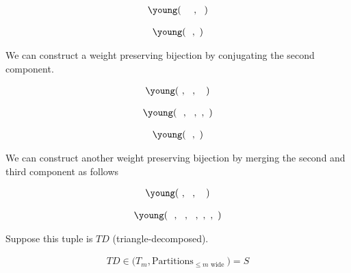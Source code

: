 \documentclass{report}
\begin{document}
{\begin{enumerate}
\begin{multicols}{3}
              \columnbreak

              \begin{align*}
                  \young(~~~~,~~)
              \end{align*}

              \columnbreak

              \begin{align*}
                  \young(~~,~)
              \end{align*}
          \end{multicols}

          We can construct a weight preserving bijection by conjugating the second component.

          \begin{multicols}{3}
              \begin{align*}
                  \young(~,~~,~~~)
              \end{align*}

              \columnbreak

              \begin{align*}
                  \young(~~,~~,~,~)
              \end{align*}

              \columnbreak

              \begin{align*}
                  \young(~~,~)
              \end{align*}
          \end{multicols}

          We can construct another weight preserving bijection by merging the second and third component as follows

          \begin{multicols}{2}
              \begin{align*}
                  \young(~,~~,~~~)
              \end{align*}

              \columnbreak

              \begin{align*}
                  \young(~~,~~,~~,~,~,~)
              \end{align*}
          \end{multicols}

          Suppose this tuple is $TD$ (triangle-decomposed).

          \begin{align*}
              TD \in \Big ( T_m, \text{Partitions}_{\le m \text{ wide }} \Big ) = S
          \end{align*}


\end{enumerate}}
\end{document}
